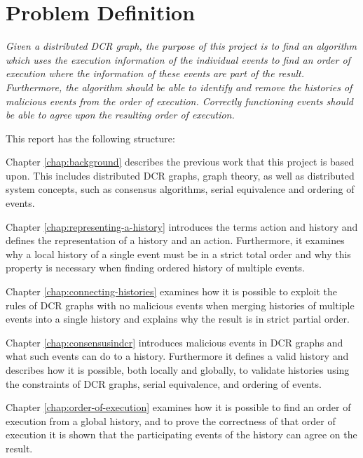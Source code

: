 \section{Problem Definition}
	\textit{Given a distributed DCR graph, the purpose of this project is to find an algorithm which uses the execution information of the individual events to find an order of execution where the information of these events are part of the result. Furthermore, the algorithm should be able to identify and remove the histories of malicious events from the order of execution. Correctly functioning events should be able to agree upon the resulting order of execution.}
	
	\vspace{0.4cm}
	
	\newpar
	This report has the following structure:
	
	\newpar
	Chapter \ref{chap:background} describes the previous work that this project is based upon. This includes distributed DCR graphs, graph theory, as well as distributed system concepts, such as consensus algorithms, serial equivalence and ordering of events.
		
	\newpar
	Chapter \ref{chap:representing-a-history} introduces the terms action and history and defines the representation of a history and an action.
	Furthermore, it examines why a local history of a single event must be in a strict total order and why this property is necessary when finding ordered history of multiple events. 
		
	\newpar
	Chapter \ref{chap:connecting-histories} examines how it is possible to exploit the rules of DCR graphs with no malicious events when merging histories of multiple events into a single history and explains why the result is in strict partial order.
	
	\newpar
	Chapter \ref{chap:consensusindcr} introduces malicious events in DCR graphs and what such events can do to a history. Furthermore it defines a valid history and describes how it is possible, both locally and globally, to validate histories using the constraints of DCR graphs, serial equivalence, and ordering of events.
	
    \newpar
    Chapter \ref{chap:order-of-execution} examines how it is possible to find an order of execution from a global history, and to prove the correctness of that order of execution it is shown that the participating events of the history can agree on the result.
		
	